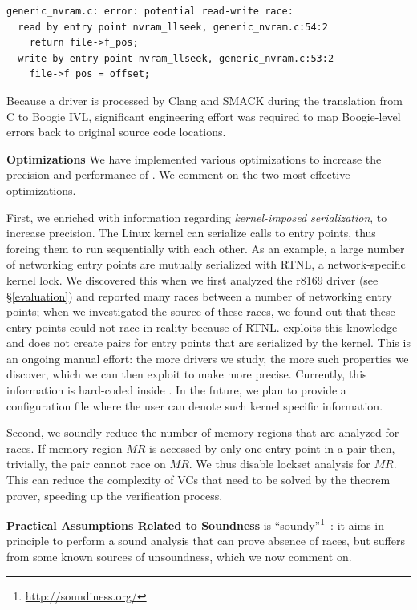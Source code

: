 \begin{lstlisting}[keywordstyle=\ttfamily]
generic_nvram.c: error: potential read-write race:
  read by entry point nvram_llseek, generic_nvram.c:54:2
    return file->f_pos;
  write by entry point nvram_llseek, generic_nvram.c:53:2
    file->f_pos = offset;
\end{lstlisting}

Because a driver is processed by Clang and SMACK during the translation from C to Boogie IVL, significant engineering effort was required to map Boogie-level errors back to original source code locations.

\noindent\textbf{Optimizations }
%
We have implemented various optimizations to increase the precision and performance of \whoop.  We comment on the two most effective optimizations.

First, we enriched \whoop with information regarding \emph{kernel-imposed serialization}, to increase precision. The Linux kernel can serialize calls to entry points, thus forcing them to run sequentially with each other. As an example, a large number of networking entry points are mutually serialized with RTNL, a network-specific kernel lock. We discovered this when we first analyzed the r8169 driver (see \S\ref{evaluation}) and \whoop reported many races between a number of networking entry points; when we investigated the source of these races, we found out that these entry points could not race in reality because of RTNL. \whoop exploits this knowledge and does not create pairs for entry points that are serialized by the kernel. This is an ongoing manual effort: the more drivers we study, the more such properties we discover, which we can then exploit to make \whoop more precise. Currently, this information is hard-coded inside \whoop. In the future, we plan to provide a configuration file where the user can denote such kernel specific information.

Second, we soundly reduce the number of memory regions that are analyzed for races.  If memory region $\mathit{MR}$ is accessed by only one entry point in a pair then, trivially, the pair cannot race on $\mathit{MR}$.  We thus disable lockset analysis for $\mathit{MR}$.  This can reduce the complexity of VCs that need to be solved by the theorem prover, speeding up the verification process.

\noindent\textbf{Practical Assumptions Related to Soundness}
%
\whoop is ``soundy''\footnote{\url{http://soundiness.org/}}~\cite{soundiness}: it aims in principle to perform a sound analysis that can prove absence of races, but suffers from some known sources of unsoundness, which we now comment on.

